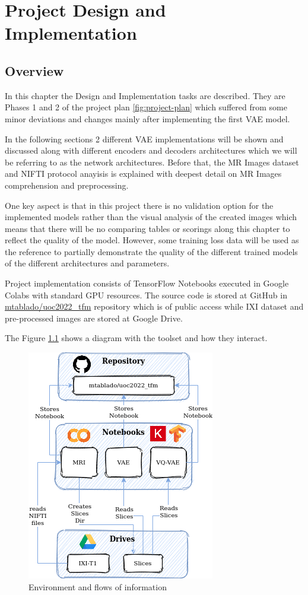 \chapter{Project Design and Implementation}

\section{Overview}
\label{sec:imploverview}
In this chapter the Design and Implementation tasks are described. They are Phases 1 and 2 of the project plan \ref{fig:project-plan} which suffered from some minor deviations and changes mainly after implementing the first VAE model.

In the following sections 2 different VAE implementations will be shown and discussed along with different encoders and decoders architectures which we will be referring to as the network architectures. Before that, the MR Images dataset and NIFTI protocol anayisis is explained with deepest detail on MR Images comprehension and preprocessing.

One key aspect is that in this project there is no validation option for the implemented models rather than the visual analysis of the created images which means that there will be no comparing tables or scorings along this chapter to reflect the quality of the model. However, some  training loss data will be used as the reference to partially demonstrate the quality of the different trained models of the different architectures and parameters.   

Project implementation consists of TensorFlow Notebooks executed in Google Colabs with standard GPU resources. The source code is stored at GitHub in \href{https://github.com/mtablado/uoc2022_tfm}{mtablado/uoc2022\_tfm} repository which is of public access while IXI dataset and pre-processed images are stored at Google Drive.

The Figure \ref{fig:environment} shows a diagram with the toolset and how they interact.

\begin{figure}[ht]
    \centering
    \includegraphics[]{images/tfm-environment.png}
    \caption[Environment and flows of information]{Environment and flows of information}
    \label{fig:environment}
\end{figure}


